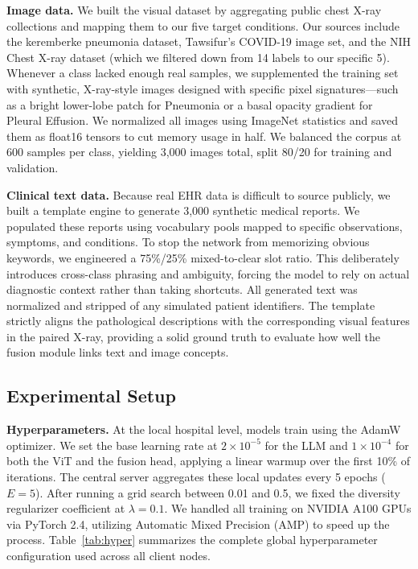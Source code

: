 \documentclass[letterpaper, conference]{IEEEtran}
\begin{document}
\textbf{Image data.}
We built the visual dataset by aggregating public chest X-ray collections and mapping them to our five target conditions. Our sources include the keremberke pneumonia dataset, Tawsifur's COVID-19 image set, and the NIH Chest X-ray dataset (which we filtered down from 14 labels to our specific 5). Whenever a class lacked enough real samples, we supplemented the training set with synthetic, X-ray-style images designed with specific pixel signatures---such as a bright lower-lobe patch for Pneumonia or a basal opacity gradient for Pleural Effusion. We normalized all images using ImageNet statistics and saved them as float16 tensors to cut memory usage in half. We balanced the corpus at 600 samples per class, yielding 3,000 images total, split 80/20 for training and validation.

\textbf{Clinical text data.}
Because real EHR data is difficult to source publicly, we built a template engine to generate 3,000 synthetic medical reports. We populated these reports using vocabulary pools mapped to specific observations, symptoms, and conditions. To stop the network from memorizing obvious keywords, we engineered a 75\%/25\% mixed-to-clear slot ratio. This deliberately introduces cross-class phrasing and ambiguity, forcing the model to rely on actual diagnostic context rather than taking shortcuts. All generated text was normalized and stripped of any simulated patient identifiers. The template strictly aligns the pathological descriptions with the corresponding visual features in the paired X-ray, providing a solid ground truth to evaluate how well the fusion module links text and image concepts.

\subsection{Experimental Setup}
\textbf{Hyperparameters.}
At the local hospital level, models train using the AdamW optimizer. We set the base learning rate at $2{\times}10^{-5}$ for the LLM and $1{\times}10^{-4}$ for both the ViT and the fusion head, applying a linear warmup over the first 10\% of iterations. The central server aggregates these local updates every 5 epochs ($E=5$). After running a grid search between 0.01 and 0.5, we fixed the diversity regularizer coefficient at $\lambda=0.1$. We handled all training on NVIDIA A100 GPUs via PyTorch 2.4, utilizing Automatic Mixed Precision (AMP) to speed up the process. Table~\ref{tab:hyper} summarizes the complete global hyperparameter configuration used across all client nodes.
\end{document}

